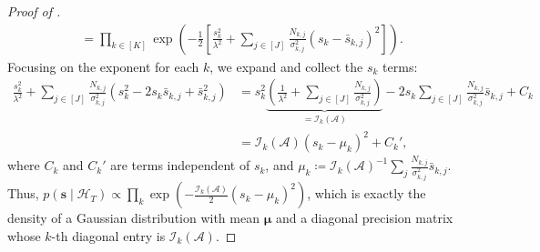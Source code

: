 \documentclass[10pt,a4paper]{amsart}
\def\gA{{\mathcal{A}}}
\def\gH{{\mathcal{H}}}
\def\gI{{\mathcal{I}}}
\def\vs{{\bm{s}}}
\begin{document}
\begin{proof}[Proof of ]
\begin{align}
        &= \prod_{k \in [K]} \exp \left( - \frac{1}{2} \left[ \frac{s_k^2}{\lambda^2} + \sum_{j \in [J]} \frac{N_{k,j}}{\sigma_{k,j}^2} (s_k - \bar{s}_{k,j})^2 \right] \right).
    \end{align}
    Focusing on the exponent for each $k$, we expand and collect the $s_k$ terms:
    \begin{align}
        \frac{s_k^2}{\lambda^2} + \sum_{j \in [J]} \frac{N_{k,j}}{\sigma_{k,j}^2} (s_k^2 - 2 s_k \bar{s}_{k,j} + \bar{s}_{k,j}^2)
        &= s_k^2 \underbrace{\left( \frac{1}{\lambda^2} + \sum_{j \in [J]} \frac{N_{k,j}}{\sigma_{k,j}^2} \right)}_{= \gI_k(\gA)} - 2s_k \sum_{j \in [J]} \frac{N_{k,j}}{\sigma_{k,j}^2} \bar{s}_{k,j} + C_k \\
        &= \gI_k(\gA) (s_k - \mu_k)^2 + C_k',
    \end{align}
    where $C_k$ and $C_k'$ are terms independent of $s_k$, and $\mu_k \coloneq \gI_k(\gA)^{-1} \sum_j \frac{N_{k,j}}{\sigma_{k,j}^2} \bar{s}_{k,j}$.
    Thus, $p(\vs \mid \gH_T) \propto \prod_k \exp\left( - \frac{\gI_k(\gA)}{2} (s_k - \mu_k)^2 \right)$, which is exactly the density of a Gaussian distribution with mean $\boldsymbol{\mu}$ and a diagonal precision matrix whose $k$-th diagonal entry is $\gI_k(\gA)$.
\end{proof}
\end{document}
